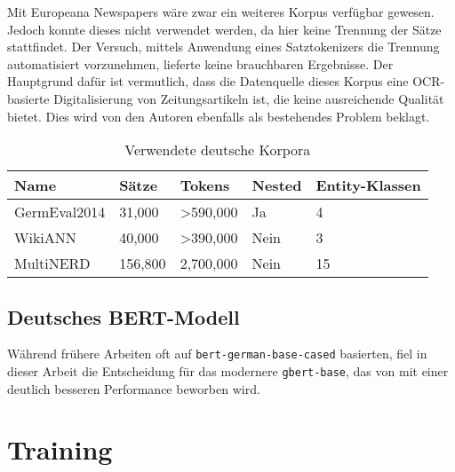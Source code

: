 Mit Europeana Newspapers \parencite{europeana} wäre zwar ein weiteres Korpus verfügbar gewesen. Jedoch konnte dieses nicht verwendet werden, da hier keine Trennung der Sätze stattfindet. Der Versuch, mittels Anwendung eines Satztokenizers die Trennung automatisiert vorzunehmen, lieferte keine brauchbaren Ergebnisse. Der Hauptgrund dafür ist vermutlich, dass die Datenquelle dieses Korpus eine OCR-basierte Digitalisierung von Zeitungsartikeln ist, die keine ausreichende Qualität bietet. Dies wird von den Autoren ebenfalls als bestehendes Problem beklagt.

\begin{table}[!htbp]
	\centering
	\caption{Verwendete deutsche Korpora}
	\label{tab:korpora}
	\begin{tabular}{@{}lllll@{}}
		\toprule
		\textbf{Name}   & \textbf{Sätze} & \textbf{Tokens}       & \textbf{Nested} & \textbf{Entity-Klassen} \\ \midrule
		GermEval2014    & 31,000         & \textgreater{}590,000 & Ja              & 4                       \\
		WikiANN         & 40,000         & \textgreater{}390,000 & Nein            & 3                       \\
		MultiNERD\footnotemark       & 156,800        & 2,700,000             & Nein            & 15                      \\ \bottomrule
		\end{tabular}
\end{table}

\section{Deutsches BERT-Modell}
\label{ch:MRC:sec:DeutschBERT}

Während frühere Arbeiten oft auf \verb|bert-german-base-cased| \parencite{bert-base-german-cased} basierten, fiel in dieser Arbeit die Entscheidung für das modernere \verb|gbert-base|, das von \cite{gbert} mit einer deutlich besseren Performance beworben wird.

\chapter{Training}
\label{ch:Training}

